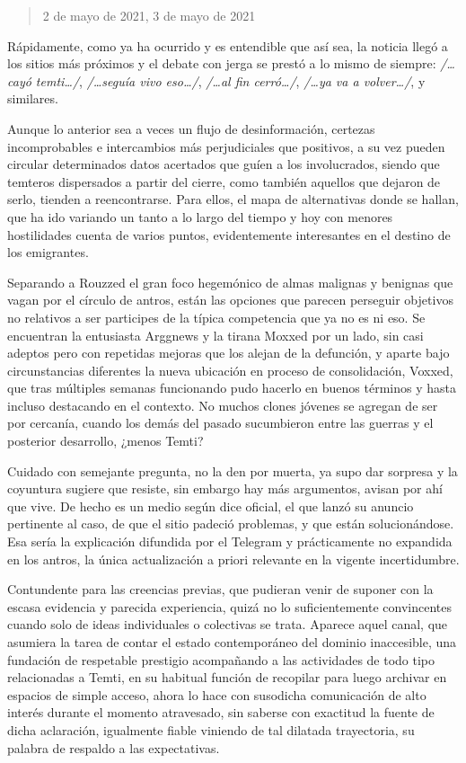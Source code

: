 \documentclass[
]{book}
\begin{document}
\begin{quote}
2 de mayo de 2021, 3 de mayo de 2021
\end{quote}

Rápidamente, como ya ha ocurrido y es entendible que así sea, la noticia llegó a los sitios más próximos y el debate con jerga se prestó a lo mismo de siempre: \emph{/\ldots cayó temti\ldots/}, \emph{/\ldots seguía vivo eso\ldots/}, \emph{/\ldots al fin cerró\ldots/}, \emph{/\ldots ya va a volver\ldots/}, y similares.

Aunque lo anterior sea a veces un flujo de desinformación, certezas incomprobables e intercambios más perjudiciales que positivos, a su vez pueden circular determinados datos acertados que guíen a los involucrados, siendo que temteros dispersados a partir del cierre, como también aquellos que dejaron de serlo, tienden a reencontrarse. Para ellos, el mapa de alternativas donde se hallan, que ha ido variando un tanto a lo largo del tiempo y hoy con menores hostilidades cuenta de varios puntos, evidentemente interesantes en el destino de los emigrantes.

Separando a Rouzzed el gran foco hegemónico de almas malignas y benignas que vagan por el círculo de antros, están las opciones que parecen perseguir objetivos no relativos a ser participes de la típica competencia que ya no es ni eso. Se encuentran la entusiasta Arggnews y la tirana Moxxed por un lado, sin casi adeptos pero con repetidas mejoras que los alejan de la defunción, y aparte bajo circunstancias diferentes la nueva ubicación en proceso de consolidación, Voxxed, que tras múltiples semanas funcionando pudo hacerlo en buenos términos y hasta incluso destacando en el contexto. No muchos clones jóvenes se agregan de ser por cercanía, cuando los demás del pasado sucumbieron entre las guerras y el posterior desarrollo, ¿menos Temti?

Cuidado con semejante pregunta, no la den por muerta, ya supo dar sorpresa y la coyuntura sugiere que resiste, sin embargo hay más argumentos, avisan por ahí que vive. De hecho es un medio según dice oficial, el que lanzó su anuncio pertinente al caso, de que el sitio padeció problemas, y que están solucionándose. Esa sería la explicación difundida por el Telegram y prácticamente no expandida en los antros, la única actualización a priori relevante en la vigente incertidumbre.

Contundente para las creencias previas, que pudieran venir de suponer con la escasa evidencia y parecida experiencia, quizá no lo suficientemente convincentes cuando solo de ideas individuales o colectivas se trata. Aparece aquel canal, que asumiera la tarea de contar el estado contemporáneo del dominio inaccesible, una fundación de respetable prestigio acompañando a las actividades de todo tipo relacionadas a Temti, en su habitual función de recopilar para luego archivar en espacios de simple acceso, ahora lo hace con susodicha comunicación de alto interés durante el momento atravesado, sin saberse con exactitud la fuente de dicha aclaración, igualmente fiable viniendo de tal dilatada trayectoria, su palabra de respaldo a las expectativas.
\end{document}
